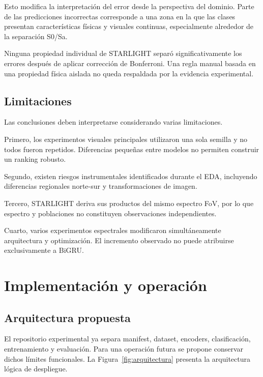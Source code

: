\documentclass[letterpaper,11pt]{article}
\begin{document}
Esto modifica la interpretación del error desde la perspectiva del dominio. Parte de las predicciones incorrectas corresponde a una zona en la que las clases presentan características físicas y visuales continuas, especialmente alrededor de la separación S0/Sa. 

Ninguna propiedad individual de STARLIGHT separó significativamente los errores después de aplicar corrección de Bonferroni. Una regla manual basada en una propiedad física aislada no queda respaldada por la evidencia experimental.

\subsection{Limitaciones} 

Las conclusiones deben interpretarse considerando varias limitaciones. 

Primero, los experimentos visuales principales utilizaron una sola semilla y no todos fueron repetidos. Diferencias pequeñas entre modelos no permiten construir un ranking robusto. 

Segundo, existen riesgos instrumentales identificados durante el EDA, incluyendo diferencias regionales norte-sur y transformaciones de imagen. 

Tercero, STARLIGHT deriva sus productos del mismo espectro FoV, por lo que espectro y poblaciones no constituyen observaciones independientes. 

Cuarto, varios experimentos espectrales modificaron simultáneamente arquitectura y optimización. El incremento observado no puede atribuirse exclusivamente a BiGRU.

\section{Implementación y operación} 
\subsection{Arquitectura propuesta}

El repositorio experimental ya separa manifest, dataset, encoders, clasificación, entrenamiento y evaluación. Para una operación futura se propone conservar dichos límites funcionales. La Figura~\ref{fig:arquitectura} presenta la arquitectura lógica de despliegue.
\end{document}
